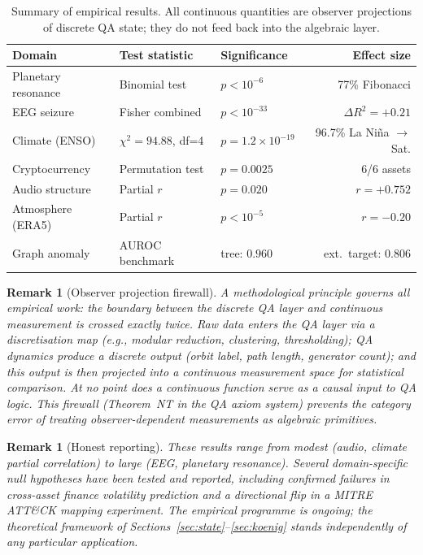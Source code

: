 \documentclass[11pt]{article}
\newtheorem{remark}[definition]{Remark}
\begin{document}
\begin{table}[h]
\centering
\small
\begin{tabular}{lllr}
\toprule
\textbf{Domain} & \textbf{Test statistic} & \textbf{Significance} & \textbf{Effect size} \\
\midrule
Planetary resonance & Binomial test & $p < 10^{-6}$ & 77\% Fibonacci \\
EEG seizure         & Fisher combined & $p < 10^{-33}$ & $\Delta R^2 = +0.21$ \\
Climate (ENSO)      & $\chi^2 = 94.88$, df=4 & $p = 1.2\times10^{-19}$ & 96.7\% La Ni\~na $\to$ Sat. \\
Cryptocurrency      & Permutation test & $p = 0.0025$ & 6/6 assets \\
Audio structure      & Partial $r$ & $p = 0.020$ & $r = +0.752$ \\
Atmosphere (ERA5)   & Partial $r$ & $p < 10^{-5}$ & $r = -0.20$ \\
Graph anomaly       & AUROC benchmark & tree: $0.960$ & ext.\ target: $0.806$ \\
\bottomrule
\end{tabular}
\caption{Summary of empirical results.  All continuous quantities are observer projections of discrete QA state; they do not feed back into the algebraic layer.}
\label{tab:empirical}
\end{table}

\begin{remark}[Observer projection firewall]
A methodological principle governs all empirical work: the boundary between the discrete QA layer and continuous measurement is crossed exactly twice.  Raw data enters the QA layer via a discretisation map (e.g., modular reduction, clustering, thresholding); QA dynamics produce a discrete output (orbit label, path length, generator count); and this output is then projected into a continuous measurement space for statistical comparison.  At no point does a continuous function serve as a causal input to QA logic.  This firewall (Theorem~NT in the QA axiom system) prevents the category error of treating observer-dependent measurements as algebraic primitives.
\end{remark}

\begin{remark}[Honest reporting]
These results range from modest (audio, climate partial correlation) to large (EEG, planetary resonance).  Several domain-specific null hypotheses have been tested and reported, including confirmed failures in cross-asset finance volatility prediction and a directional flip in a MITRE ATT\&CK mapping experiment.  The empirical programme is ongoing; the theoretical framework of Sections~\ref{sec:state}--\ref{sec:koenig} stands independently of any particular application.
\end{remark}
\end{document}

